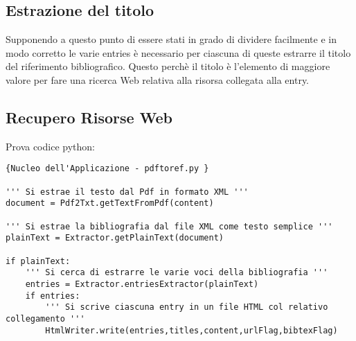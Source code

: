 \subsection{Estrazione del titolo}
Supponendo a questo punto di essere stati in grado di dividere facilmente e in modo corretto le varie entries è necessario per ciascuna di queste estrarre il titolo del riferimento bibliografico. Questo perchè il titolo è l'elemento di maggiore valore per fare una ricerca Web relativa alla risorsa collegata alla entry.  

\subsection{Recupero Risorse Web}


Prova codice python:


\begin{lstlisting}[frame=r,caption=Nucleo dell'Applicazione - pdftoref.py ,breaklines=true,basicstyle=\small]{Nucleo dell'Applicazione - pdftoref.py }

''' Si estrae il testo dal Pdf in formato XML '''
document = Pdf2Txt.getTextFromPdf(content)

''' Si estrae la bibliografia dal file XML come testo semplice '''
plainText = Extractor.getPlainText(document)

if plainText:
	''' Si cerca di estrarre le varie voci della bibliografia '''
	entries = Extractor.entriesExtractor(plainText)
	if entries:
		''' Si scrive ciascuna entry in un file HTML col relativo collegamento '''
		HtmlWriter.write(entries,titles,content,urlFlag,bibtexFlag)

\end{lstlisting}
